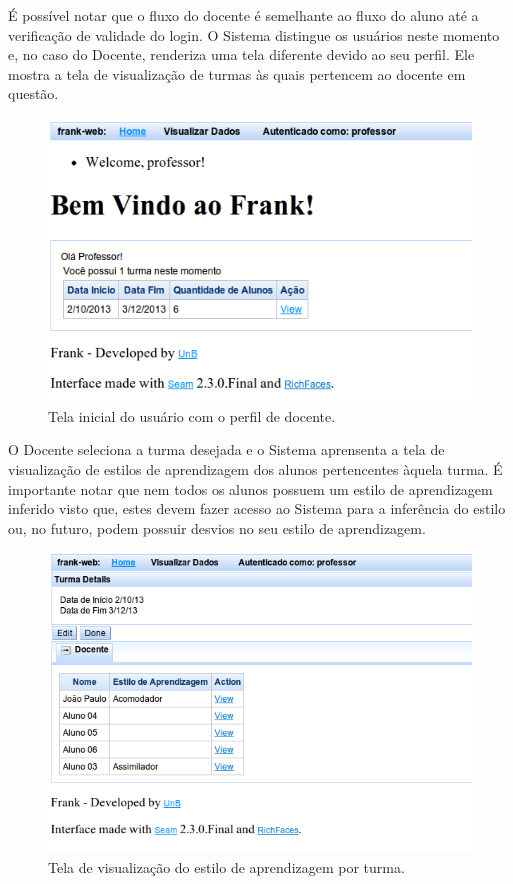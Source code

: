 É possível notar que o fluxo do docente é semelhante ao fluxo do aluno até a verificação de validade do login. O Sistema distingue os usuários neste momento e, no caso do Docente, renderiza uma tela diferente devido ao seu perfil. Ele mostra a tela de visualização de turmas às quais pertencem ao docente em questão.

\begin{figure}
	\centering
	\includegraphics[scale=0.6]{images/frank-tela-professor-acesso.png}
	\caption{Tela inicial do usuário com o perfil de docente.}
	\label{fig:frank-tela-professor-acesso}
\end{figure}

O Docente seleciona a turma desejada e o Sistema aprensenta a tela de visualização de estilos de aprendizagem dos alunos pertencentes àquela turma. É importante notar que nem todos os alunos possuem um estilo de aprendizagem inferido visto que, estes devem fazer acesso ao Sistema para a inferência do estilo ou, no futuro, podem possuir desvios no seu estilo de aprendizagem.

\begin{figure}
	\centering
	\includegraphics[scale=0.6]{images/frank-tela-professor-visualizar-turma.png}
	\caption{Tela de visualização do estilo de aprendizagem por turma.}
	\label{fig:frank-tela-professor-visualizar-turma}
\end{figure}

